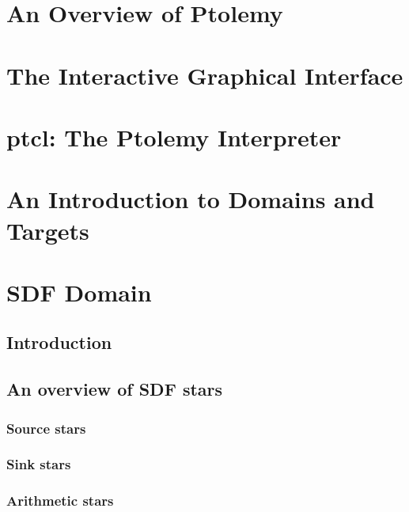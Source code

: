 
\chapter{An Overview of Ptolemy}
\label{An.Overview.of.Ptolemy}

\chapter{The Interactive Graphical Interface}
\label{The.Interactive.Graphical.Interface}

\chapter{ptcl:  The Ptolemy Interpreter}
\label{ptcl:The.Ptolemy.Interpreter}

\chapter{An Introduction to Domains and Targets}
\label{An.Introduction.to.Domains.and.Targets}

\chapter{SDF Domain}
\label{SDF.Domain}

\section{Introduction}
\label{SDF.Introduction}

\section{An overview of SDF stars}
\label{SDF.Star.Overview}

\subsection{Source stars}
\label{SDF.Source.Stars}

\subsection{Sink stars}
\label{SDF.Sink.Stars}

\subsection{Arithmetic stars}
\label{SDF.Arithmetic.Stars}

